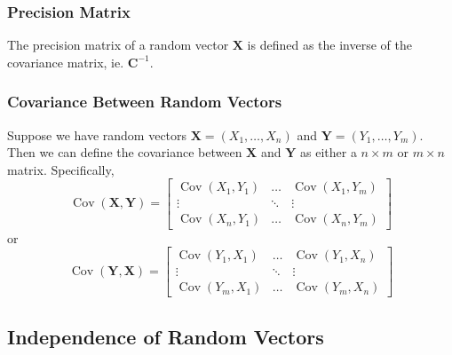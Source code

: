 \documentclass[11pt]{report} %
\begin{document}
\subsubsection{Precision Matrix}

The precision matrix of a random vector $\mathbf{X}$ is defined as the inverse of the covariance matrix, ie. $\mathbf{C}^{-1}$.

\subsubsection{Covariance Between Random Vectors}

Suppose we have random vectors $\mathbf{X} = \left(X_{1}, \dots, X_{n}\right)$ and $\mathbf{Y} = \left(Y_{1}, \dots, Y_{m}\right)$. Then we can define the covariance between $\mathbf{X}$ and $\mathbf{Y}$ as either a $n\times m$ or $m \times n$ matrix. Specifically,
\begin{equation}
\operatorname{Cov}\left(\mathbf{X}, \mathbf{Y}\right) = \begin{bmatrix}\operatorname{Cov}\left(X_{1},Y_{1}\right) & \dots & \operatorname{Cov}\left(X_{1},Y_{m}\right)\\
\vdots & \ddots & \vdots\\
\operatorname{Cov}\left(X_{n},Y_{1}\right) & \dots & \operatorname{Cov}\left(X_{n},Y_{m}\right)
\end{bmatrix}
\end{equation}
or
\begin{equation}
\operatorname{Cov}\left(\mathbf{Y},\mathbf{X}\right)=\begin{bmatrix}\operatorname{Cov}\left(Y_{1},X_{1}\right) & \dots & \operatorname{Cov}\left(Y_{1},X_{n}\right)\\
\vdots & \ddots & \vdots\\
\operatorname{Cov}\left(Y_{m},X_{1}\right) & \dots & \operatorname{Cov}\left(Y_{m},X_{n}\right)
\end{bmatrix}
\end{equation}

\subsection{Independence of Random Vectors}
\end{document}
